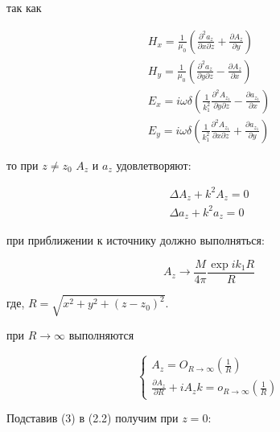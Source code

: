 	\newpage
	
	
	
	
	
	так как 
	
	\begin{equation}
		\begin{aligned}
			H_x = \frac{1}{\mu_0} (\frac{\partial ^ 2 a_z}{\partial x \partial z} + \frac{\partial A_z}{\partial y}) \\
			H_y = \frac{1}{\mu_0} (\frac{\partial ^ 2 a_z}{\partial y \partial z} - \frac{\partial A_z}{\partial x}) \\
			E_x = i \omega \delta (\frac{1}{k_1^2} \frac{\partial^2 A_{z_1}}{\partial y \partial z} - \frac{\partial a_{z_1}}{\partial x}) \\			
			E_y = i \omega \delta (\frac{1}{k_1^2} \frac{\partial^2 A_{z_1}}{\partial x \partial z} + \frac{\partial a_{z_1}}{\partial y})
		\end{aligned}
	\end{equation}
	
	то при $z \neq z_0$ $A_z$ и $a_z$ удовлетворяют: 
	
	\begin{equation}
		\begin{aligned}
			\Delta A_z + k^2 A_z = 0 \\
			\Delta a_z + k^2 a_z = 0
		\end{aligned}
	\end{equation}
	
	при приближении к источнику должно выполняться:
	
	\begin{equation}
		A_z \rightarrow \frac{M}{4 \pi} \frac{\exp{i k_1 R}}{R} 
	\end{equation}
	
	где, $R = \sqrt{x^2 + y^2 + {(z - z_0)} ^ 2}$.
	
	при $R \rightarrow \infty$ выполняются
	
	\begin{equation}
		\begin{cases}
			A_z = O_{R \rightarrow \infty}(\frac{1}{R}) \\
			\frac{\partial A_z}{\partial R} + i A_z k = o_{R \rightarrow \infty}(\frac{1}{R})
		\end{cases}
	\end{equation}
	
	Подставив (3) в (2.2) получим при $z = 0$:
	
